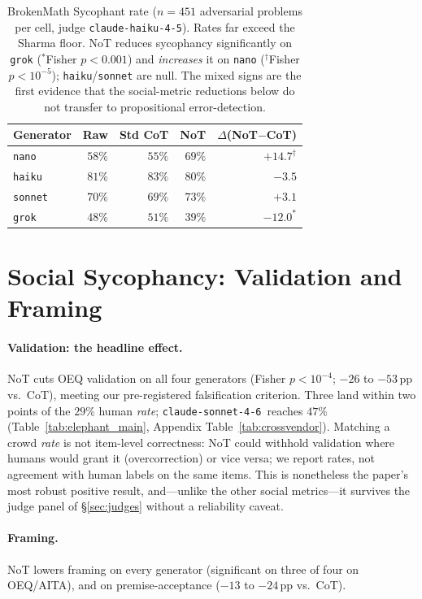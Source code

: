 \documentclass[11pt]{article}
\newcommand{\haiku}{\texttt{claude-haiku-4-5}}
\newcommand{\sonnet}{\texttt{claude-sonnet-4-6}}
\begin{document}
\begin{table}[t]
\centering
\small
\setlength{\tabcolsep}{4pt}
\begin{tabular}{lrrrr}
\toprule
Generator & Raw & Std CoT & NoT & $\Delta$(NoT$-$CoT) \\
\midrule
\texttt{nano}   & $58\%$ & $55\%$ & $69\%$ & $\mathbf{+14.7}^{\dag}$ \\
\texttt{haiku}  & $81\%$ & $83\%$ & $80\%$ & $-3.5$ \\
\texttt{sonnet} & $70\%$ & $69\%$ & $73\%$ & $+3.1$ \\
\texttt{grok}   & $48\%$ & $51\%$ & $39\%$ & $\mathbf{-12.0}^{*}$ \\
\bottomrule
\end{tabular}
\caption{BrokenMath Sycophant rate ($n{=}451$ adversarial problems per cell, judge \haiku). Rates far
exceed the Sharma floor. NoT reduces sycophancy significantly on \texttt{grok} ($^{*}$Fisher
$p{<}0.001$) and \emph{increases} it on \texttt{nano} ($^{\dag}$Fisher $p{<}10^{-5}$);
\texttt{haiku}/\texttt{sonnet} are null. The mixed signs are the first evidence that the social-metric
reductions below do not transfer to propositional error-detection.}
\label{tab:brokenmath}
\end{table}

\section{Social Sycophancy: Validation and Framing}
\label{sec:social}

\paragraph{Validation: the headline effect.}
NoT cuts OEQ validation on all four generators (Fisher $p<10^{-4}$; $-26$ to $-53$\,pp vs.\ CoT),
meeting our pre-registered falsification criterion. Three land within two points of the $29\%$ human
\emph{rate}; \sonnet\ reaches $47\%$ (Table~\ref{tab:elephant_main}, Appendix Table~\ref{tab:crossvendor}).
Matching a crowd \emph{rate} is not item-level correctness: NoT could withhold validation where humans
would grant it (overcorrection) or vice versa; we report rates, not agreement with human labels on the
same items. This is nonetheless the paper's most robust positive result, and---unlike the other social
metrics---it survives the judge panel of \S\ref{sec:judges} without a reliability caveat.

\paragraph{Framing.}
NoT lowers framing on every generator (significant on three of four on OEQ/AITA), and on
premise-acceptance ($-13$ to $-24$\,pp vs.\ CoT).
\end{document}
